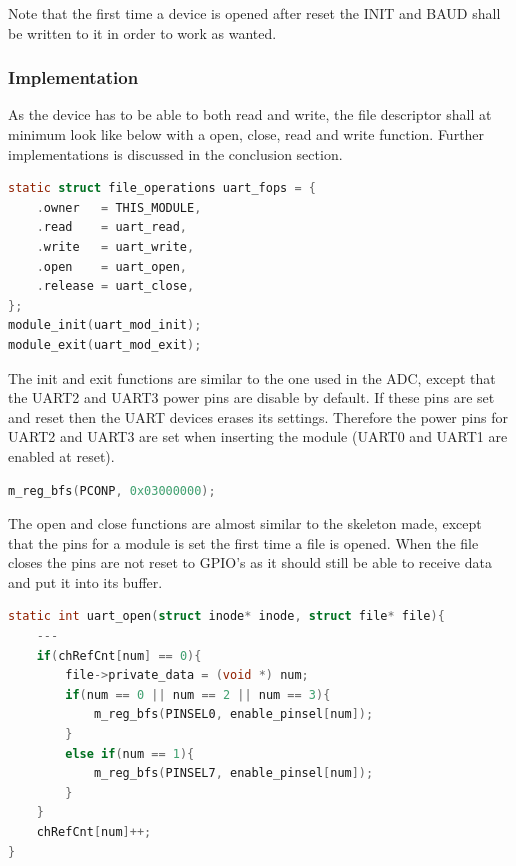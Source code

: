 Note that the first time a device is opened after reset the INIT and BAUD shall be written to it in order to work as wanted. 
%
\subsubsection{Implementation}
As the device has to be able to both read and write, the file descriptor shall at minimum look like below with a open, close, read and write function. Further implementations is discussed in the conclusion section.
\begin{lstlisting}[language=c]
static struct file_operations uart_fops = {
	.owner   = THIS_MODULE,
	.read	 = uart_read,
	.write   = uart_write,
	.open    = uart_open,
	.release = uart_close,
};
module_init(uart_mod_init);
module_exit(uart_mod_exit);
\end{lstlisting}

The init and exit functions are similar to the one used in the ADC, except that the UART2 and UART3 power pins are disable by default. If these pins are set and reset then the UART devices erases its settings. Therefore the power pins for UART2 and UART3 are set when inserting the module (UART0 and UART1 are enabled at reset).
\begin{lstlisting}[language=c]
m_reg_bfs(PCONP, 0x03000000);
\end{lstlisting}

The open and close functions are almost similar to the skeleton made, except that the pins for a module is set the first time a file is opened. When the file closes the pins are not reset to GPIO's as it should still be able to receive data and put it into its buffer. 
\begin{lstlisting}[language=c]
static int uart_open(struct inode* inode, struct file* file){
	---
	if(chRefCnt[num] == 0){
		file->private_data = (void *) num;
		if(num == 0 || num == 2 || num == 3){
			m_reg_bfs(PINSEL0, enable_pinsel[num]);
		}
		else if(num == 1){
			m_reg_bfs(PINSEL7, enable_pinsel[num]);
		}
	}
	chRefCnt[num]++;
}
\end{lstlisting}

